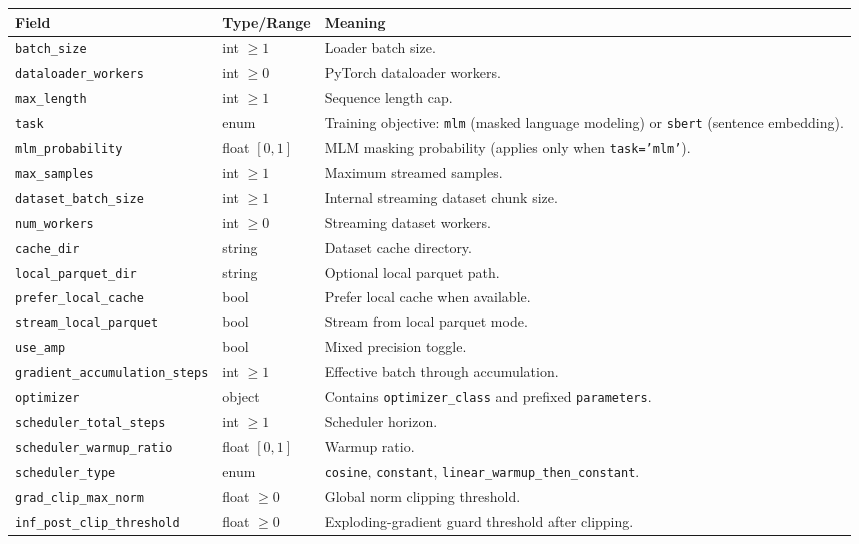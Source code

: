 \documentclass[11pt,a4paper]{article}
\begin{document}
\small
\begin{longtable}{p{5.1cm}p{2.4cm}p{7.0cm}}
\toprule
\textbf{Field} & \textbf{Type/Range} & \textbf{Meaning} \\
\midrule
\endhead
\texttt{batch\_size} & int $\ge 1$ & Loader batch size. \\
\texttt{dataloader\_workers} & int $\ge 0$ & PyTorch dataloader workers. \\
\texttt{max\_length} & int $\ge 1$ & Sequence length cap. \\
\texttt{task} & enum & Training objective: \texttt{mlm} (masked language modeling) or \texttt{sbert} (sentence embedding). \\
\texttt{mlm\_probability} & float $[0,1]$ & MLM masking probability (applies only when \texttt{task='mlm'}). \\
\texttt{max\_samples} & int $\ge 1$ & Maximum streamed samples. \\
\texttt{dataset\_batch\_size} & int $\ge 1$ & Internal streaming dataset chunk size. \\
\texttt{num\_workers} & int $\ge 0$ & Streaming dataset workers. \\
\texttt{cache\_dir} & string & Dataset cache directory. \\
\texttt{local\_parquet\_dir} & string & Optional local parquet path. \\
\texttt{prefer\_local\_cache} & bool & Prefer local cache when available. \\
\texttt{stream\_local\_parquet} & bool & Stream from local parquet mode. \\
\texttt{use\_amp} & bool & Mixed precision toggle. \\
\texttt{gradient\_accumulation\_steps} & int $\ge 1$ & Effective batch through accumulation. \\
\texttt{optimizer} & object & Contains \texttt{optimizer\_class} and prefixed \texttt{parameters}. \\
\texttt{scheduler\_total\_steps} & int $\ge 1$ & Scheduler horizon. \\
\texttt{scheduler\_warmup\_ratio} & float $[0,1]$ & Warmup ratio. \\
\texttt{scheduler\_type} & enum & \texttt{cosine}, \texttt{constant}, \texttt{linear\_warmup\_then\_constant}. \\
\texttt{grad\_clip\_max\_norm} & float $\ge 0$ & Global norm clipping threshold. \\
\texttt{inf\_post\_clip\_threshold} & float $\ge 0$ & Exploding-gradient guard threshold after clipping. \\

\end{longtable}
\end{document}
